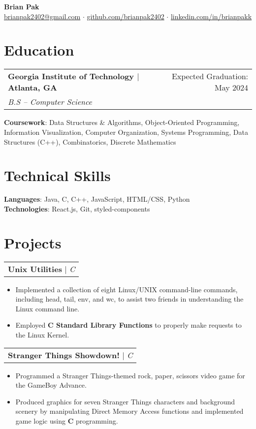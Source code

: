 \documentclass[letterpaper,11pt]{article}
\makeatletter
\newcommand{\resumeEducationHeading}[4]{
    \begin{tabular*}{0.99\textwidth}[t]{l@{\extracolsep{\fill}}r}
      \textbf{#1} & #2 \\
      \textit{\small#3} & \textit{\small #4} \\
    \end{tabular*}\vspace{0.5pt}
}
\newcommand{\resumeProjectHeading}[2]{
    \begin{tabular*}{0.97\textwidth}[t]{l@{\extracolsep{\fill}}}
      \textbf{#1} $\vert$ \textit{#2} 
    \end{tabular*}\vspace{-4pt}
}
\newcommand{\resumeItemListStart}{\begin{itemize}[noitemsep]\vspace{-4pt}}
\newcommand{\resumeItemListEnd}{\end{itemize}}
\makeatother
\begin{document}
\begin{center}
  \textbf{\huge Brian Pak} \\
  \vspace*{0.1cm}
   \href{mailto:brianpak2402@gmail.com}{brianpak2402@gmail.com}  $\cdot$  \href{https://github.com/brianpak2402}{github.com/brianpak2402} $\cdot$  \href{https://www.linkedin.com/in/brianpakk/}{linkedin.com/in/brianpakk}  
\end{center}

\section{Education}
    \resumeEducationHeading
      {Georgia Institute of Technology $\vert$ Atlanta, GA}{Expected Graduation: May 2024}
      {B.S -- Computer Science}{\vspace{0.1cm}} 
    \textbf{Coursework}{: Data Structures \& Algorithms, Object-Oriented Programming, Information Visualization, Computer Organization, Systems Programming, Data Structures (C++), Combinatorics, Discrete Mathematics} \\

\section{Technical Skills}
    \textbf{Languages}{: Java, C, C++, JavaScript, HTML/CSS, Python} \\
    \textbf{Technologies}{: React.js, Git, styled-components} \\

\section{Projects}
    \resumeProjectHeading{Unix Utilities}{C}
      \resumeItemListStart
        \item {Implemented a collection of eight Linux/UNIX command-line commands, including head, tail, env, and wc, to assist two friends in understanding the Linux command line.}
        \item {Employed \textbf{C Standard Library Functions} to properly make requests to the Linux Kernel.}
      \resumeItemListEnd

    \resumeProjectHeading{Stranger Things Showdown!}{C}
      \resumeItemListStart
        \item {Programmed a Stranger Things-themed rock, paper, scissors video game for the GameBoy Advance.}
        \item {Produced graphics for seven Stranger Things characters and background scenery by manipulating Direct Memory Access functions and implemented game logic using \textbf{C} programming.}
      \resumeItemListEnd
\end{document}
